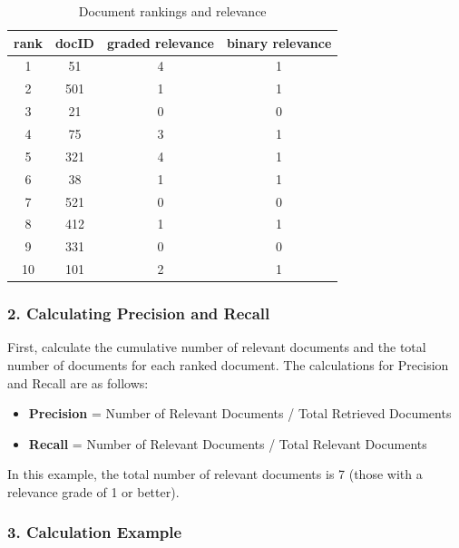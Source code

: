 \documentclass[a4paper, utf8]{ctexart}
\begin{document}
	\begin{table}[htbp]
	    \centering
	    \caption{Document rankings and relevance}
	    \begin{tabular}{c c c c}
	        \hline
	        rank & docID & graded relevance & binary relevance \\
	        \hline
	        1    & 51    & 4               & 1                \\
	        2    & 501   & 1               & 1                \\
	        3    & 21    & 0               & 0                \\
	        4    & 75    & 3               & 1                \\
	        5    & 321   & 4               & 1                \\
	        6    & 38    & 1               & 1                \\
	        7    & 521   & 0               & 0                \\
	        8    & 412   & 1               & 1                \\
	        9    & 331   & 0               & 0                \\
	        10   & 101   & 2               & 1                \\
	        \hline
	    \end{tabular}
	\end{table}
	
	\subsubsection*{2. Calculating Precision and Recall}  
	
	First, calculate the cumulative number of relevant documents and the total number of documents for each ranked document. The calculations for Precision and Recall are as follows:
	
	\begin{itemize}[itemsep=2pt, topsep=0pt, parsep=0pt]
	    \item \textbf{Precision} = Number of Relevant Documents / Total Retrieved Documents  
	    \item \textbf{Recall} = Number of Relevant Documents / Total Relevant Documents  
	\end{itemize}
	
	In this example, the total number of relevant documents is 7 (those with a relevance grade of 1 or better).
	
	\subsubsection*{3. Calculation Example}  
	
\end{document}
